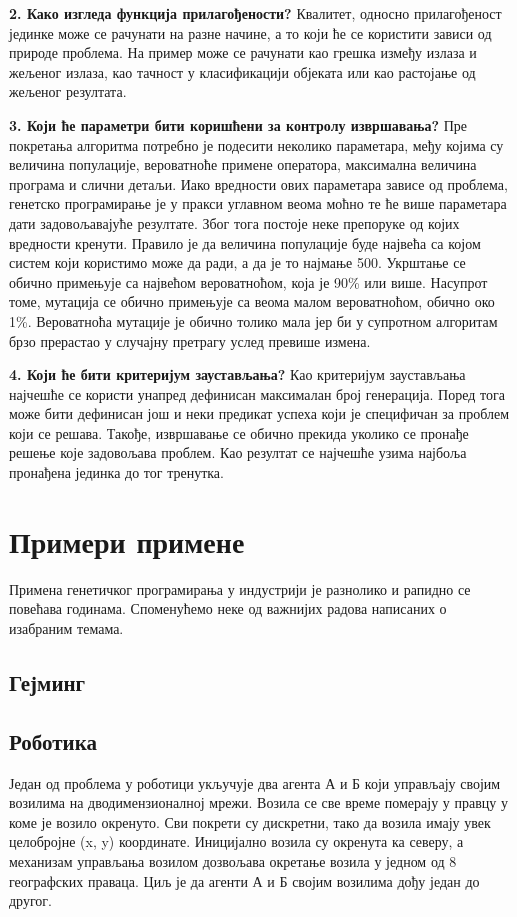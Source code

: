 \documentclass[a4paper]{article}
\begin{document}
\textbf{2. Како изгледа функција прилагођености?}\newline
Квалитет, односно прилагођеност јединке може се рачунати на разне начине, а то који ће се користити зависи од природе проблема. На пример може се рачунати као грешка између излаза и жељеног излаза, као тачност у класификацији објеката или као растојање од жељеног резултата.\newline

\textbf{3. Који ће параметри бити коришћени за контролу извршавања?}\newline
Пре покретања алгоритма потребно је подесити неколико параметара, међу којима су величина популације, вероватноће примене оператора, максимална величина програма и слични детаљи. Иако вредности ових параметара зависе од проблема, генетско програмирање је у пракси углавном веома моћно те ће више параметара дати задовољавајуће резултате. Због тога постоје неке препоруке од којих вредности кренути. Правило је да величина популације буде највећа са којом систем који користимо може да ради, а да је то најмање 500. Укрштање се обично примењује са највећом вероватноћом, која је 90\% или више. Насупрот томе, мутација се обично примењује са веома малом вероватноћом, обично око 1\%. Вероватноћа мутације је обично толико мала јер би у супротном алгоритам брзо прерастао у случајну претрагу услед превише измена.\newline

\textbf{4. Који ће бити критеријум заустављања?}\newline
Као критеријум заустављања најчешће се користи унапред дефинисан максималан број генерација. Поред тога може бити дефинисан још и неки предикат успеха који је специфичан за проблем који се решава. Такође, извршавање се обично прекида уколико се пронађе решење које задовољава проблем. Као резултат се најчешће узима најбоља пронађена јединка до тог тренутка. \newline


\section{Примери примене}
Примена генетичког програмирања у индустрији је разнолико и рапидно се повећава годинама. Споменућемо неке од важнијих радова написаних о изабраним темама.
\subsection{Гејминг}
\subsection{Роботика}
Један од проблема у роботици укључује два агента А и Б који управљају својим возилима на дводимензионалној мрежи. Возила се све време померају у правцу у коме је возило окренуто. Сви покрети су дискретни, тако да возила имају увек целобројне (x, y) координате. Иницијално возила су окренута ка северу, а механизам управљања возилом дозвољава окретање возила у једном од 8 географских праваца. Циљ је да агенти А и Б својим возилима дођу један до другог.
\end{document}
